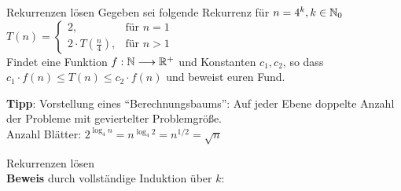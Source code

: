 \begin{frame}{Rekurrenzen lösen}
	Gegeben sei folgende Rekurrenz für $n = 4^k, k \in \mathbb{N}_0$ \\[0,5cm]
	\begin{math}
	T(n) = 
	\begin{cases}
	2,                       & \text{für } n = 1 \\
	2 \cdot T(\frac{n}{4}),  & \text{für } n > 1
	\end{cases}
	\end{math} \\[0,5cm]
	Findet eine Funktion $f : \mathbb{N} \longrightarrow \mathbb{R}^+$ und Konstanten $c_1, c_2$, so dass $c_1 \cdot f(n) \leq T(n) \leq c_2 \cdot f(n)$ und beweist euren Fund.
	
	\pause
	\bigskip
	\textbf{Tipp}: Vorstellung eines \enquote{Berechnungsbaums}: Auf jeder Ebene doppelte Anzahl der Probleme mit geviertelter Problemgröße.\\ \pause
	\impl Anzahl Blätter: \quad $2^{\log_{4}n} = n^{\log_{4}2} = n^{1/2} = \sqrt{n}$
\end{frame}

\begin{frame}{Rekurrenzen lösen}
	\solutionheading \smallskip
	 \\ \pause
	\textbf{Beweis} durch vollständige Induktion über $k$: \\ 
	 \\ \pause
	 \\ \pause
\end{frame}
	



\slideThanks
	
